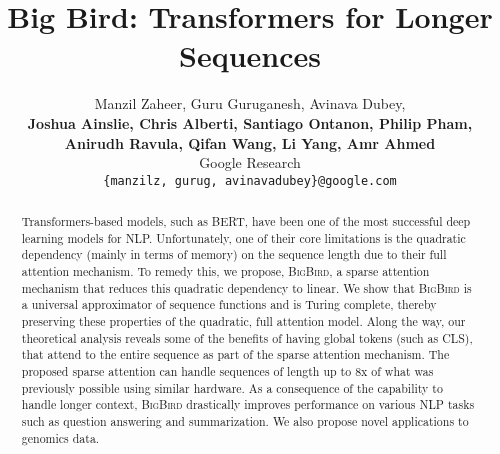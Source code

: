 \documentclass{article}
\title{Big Bird: Transformers for Longer Sequences}
\author{Manzil Zaheer,    Guru Guruganesh,   Avinava Dubey, \\
  {\bf  Joshua Ainslie,  Chris Alberti,  Santiago Ontanon,  Philip Pham,}  \\
  {\bf Anirudh Ravula,  Qifan Wang,  Li Yang,  Amr Ahmed } \\
  Google Research\\
  \texttt{\{manzilz, gurug, avinavadubey\}@google.com}
}
\newcommand{\bigb}{\textsc{BigBird}\xspace}
\begin{document}
\maketitle
\begin{abstract}

Transformers-based models, such as BERT, have been one of the most successful deep learning models for NLP. Unfortunately, one of their core limitations is the quadratic dependency (mainly in terms of memory) on the sequence length due to their full attention mechanism.  To remedy this, we propose, \bigb, a sparse attention mechanism that reduces this quadratic dependency to linear.  We show that \bigb is a universal approximator of sequence functions and is Turing complete, thereby preserving these  properties of the quadratic, full attention model. Along the way, our theoretical analysis reveals  some of the benefits of having  global tokens (such as CLS), that attend to the entire sequence  as part of the sparse attention mechanism. The proposed sparse attention can handle sequences of length up to 8x of  what was previously possible using  similar hardware.  As a consequence of the capability to handle longer context, \bigb  drastically improves performance  on various NLP tasks  such as question answering and summarization. We also propose novel applications to genomics data.
\end{abstract}
\end{document}
